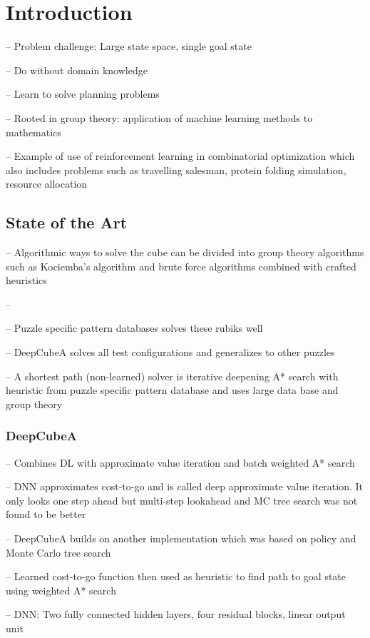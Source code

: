 \documentclass[../main.tex]{subfiles}
\begin{document}
\chapter{Introduction}
\cite{SolvingNature}
-- Problem challenge: Large state space, single goal state 

-- Do without domain knowledge

-- Learn to solve planning problems

-- Rooted in group theory: application of machine learning methods to mathematics

\cite{RubiksMedium}
-- Example of use of reinforcement learning in combinatorial optimization which also includes problems such as travelling salesman, protein folding simulation, resource allocation

\section{State of the Art}
\cite{RubiksMedium}

-- Algorithmic ways to solve the cube can be divided into group theory algorithms such as Kociemba's algorithm and brute force algorithms combined with crafted heuristics

--



\cite{SolvingNature}
-- Puzzle specific pattern databases solves these rubiks well


-- DeepCubeA solves all test configurations and generalizes to other puzzles

-- A shortest path (non-learned) solver is iterative deepening A* search with heuristic from puzzle specific pattern database and uses large data base and group theory 

\subsection{DeepCubeA}
\cite{SolvingNature}
-- Combines DL with approximate value iteration and batch weighted A* search

-- DNN approximates cost-to-go and is called deep approximate value iteration. It only looks one step ahead but multi-step lookahead  and MC tree search was not found to be better

-- DeepCubeA builds on another implementation which was based on policy and Monte Carlo tree search 

-- Learned cost-to-go function then used as heuristic to find path to goal state using weighted A* search

-- DNN: Two fully connected hidden layers, four residual blocks, linear output unit
\end{document}
